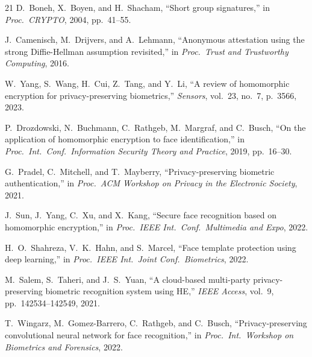 \documentclass[conference]{IEEEtran}
\begin{document}
\begin{thebibliography}{21}
D.~Boneh, X.~Boyen, and H.~Shacham,
``Short group signatures,''
in \emph{Proc.\ CRYPTO}, 2004, pp.~41--55.

J.~Camenisch, M.~Drijvers, and A.~Lehmann,
``Anonymous attestation using the strong Diffie-Hellman assumption revisited,''
in \emph{Proc.\ Trust and Trustworthy Computing}, 2016.

W.~Yang, S.~Wang, H.~Cui, Z.~Tang, and Y.~Li,
``A review of homomorphic encryption for privacy-preserving biometrics,''
\emph{Sensors}, vol.~23, no.~7, p.~3566, 2023.

P.~Drozdowski, N.~Buchmann, C.~Rathgeb, M.~Margraf, and C.~Busch,
``On the application of homomorphic encryption to face identification,''
in \emph{Proc.\ Int.\ Conf.\ Information Security Theory and Practice}, 2019, pp.~16--30.

G.~Pradel, C.~Mitchell, and T.~Mayberry,
``Privacy-preserving biometric authentication,''
in \emph{Proc.\ ACM Workshop on Privacy in the Electronic Society}, 2021.

J.~Sun, J.~Yang, C.~Xu, and X.~Kang,
``Secure face recognition based on homomorphic encryption,''
in \emph{Proc.\ IEEE Int.\ Conf.\ Multimedia and Expo}, 2022.

H.~O.~Shahreza, V.~K.~Hahn, and S.~Marcel,
``Face template protection using deep learning,''
in \emph{Proc.\ IEEE Int.\ Joint Conf.\ Biometrics}, 2022.

M.~Salem, S.~Taheri, and J.~S.~Yuan,
``A cloud-based multi-party privacy-preserving biometric recognition system using HE,''
\emph{IEEE Access}, vol.~9, pp.~142534--142549, 2021.

T.~Wingarz, M.~Gomez-Barrero, C.~Rathgeb, and C.~Busch,
``Privacy-preserving convolutional neural network for face recognition,''
in \emph{Proc.\ Int.\ Workshop on Biometrics and Forensics}, 2022.

\end{thebibliography}
\end{document}
